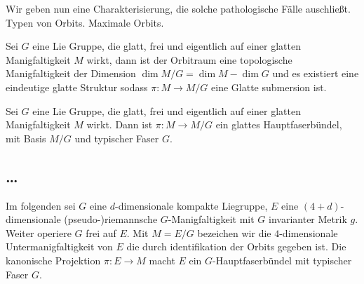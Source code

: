 Wir geben nun eine Charakterisierung, die solche pathologische
Fälle auschließt.
Typen von Orbits. Maximale Orbits.
\begin{theorem}
\end{theorem}
\begin{theorem}
Sei $G$ eine Lie Gruppe, die glatt, frei und eigentlich auf einer glatten
Manigfaltigkeit $M$ wirkt, dann ist der Orbitraum eine topologische
Manigfaltigkeit der Dimension $\dim M/G=\dim M -\dim G$ und es existiert eine
eindeutige glatte Struktur sodass $\pi:M\to  M/G$ eine Glatte submersion ist.
\end{theorem}
\begin{korollar}
Sei $G$ eine Lie Gruppe, die glatt, frei und eigentlich auf einer glatten
Manigfaltigkeit $M$ wirkt. Dann ist $\pi:M\to M/G$ ein glattes Hauptfaserbündel,
mit Basis $M/G$ und typischer Faser $G$.
\end{korollar}
\subsection{\ldots}
Im folgenden sei $G$ eine $d$-dimensionale kompakte Liegruppe, $E$ eine
$(4+d)$-dimensionale (pseudo-)riemannsche $G$-Manigfaltigkeit mit $G$
invarianter Metrik $g$. Weiter operiere $G$ frei auf $E$. Mit $M=E/G$ bezeichen
wir die $4$-dimensionale Untermanigfaltigkeit von $E$ die durch identifikation
der Orbits gegeben ist. Die kanonische Projektion $\pi:E\to M$ macht $E$ ein
$G$-Hauptfaserbündel mit typischer Faser $G$.

